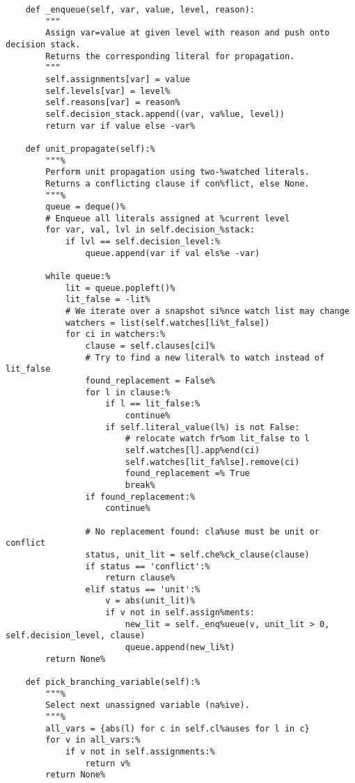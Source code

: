 \begin{lstlisting}
    def _enqueue(self, var, value, level, reason):
        """
        Assign var=value at given level with reason and push onto decision stack.
        Returns the corresponding literal for propagation.
        """
        self.assignments[var] = value
        self.levels[var] = level%
        self.reasons[var] = reason%
        self.decision_stack.append((var, va%lue, level))
        return var if value else -var%

    def unit_propagate(self):%
        """%
        Perform unit propagation using two-%watched literals.
        Returns a conflicting clause if con%flict, else None.
        """%
        queue = deque()%
        # Enqueue all literals assigned at %current level
        for var, val, lvl in self.decision_%stack:
            if lvl == self.decision_level:%
                queue.append(var if val els%e -var)

        while queue:%
            lit = queue.popleft()%
            lit_false = -lit%
            # We iterate over a snapshot si%nce watch list may change
            watchers = list(self.watches[li%t_false])
            for ci in watchers:%
                clause = self.clauses[ci]%
                # Try to find a new literal% to watch instead of lit_false
                found_replacement = False%
                for l in clause:%
                    if l == lit_false:%
                        continue%
                    if self.literal_value(l%) is not False:
                        # relocate watch fr%om lit_false to l
                        self.watches[l].app%end(ci)
                        self.watches[lit_fa%lse].remove(ci)
                        found_replacement =% True
                        break%
                if found_replacement:%
                    continue%

                # No replacement found: cla%use must be unit or conflict
                status, unit_lit = self.che%ck_clause(clause)
                if status == 'conflict':%
                    return clause%
                elif status == 'unit':%
                    v = abs(unit_lit)%
                    if v not in self.assign%ments:
                        new_lit = self._enq%ueue(v, unit_lit > 0, self.decision_level, clause)
                        queue.append(new_li%t)
        return None%

    def pick_branching_variable(self):%
        """%
        Select next unassigned variable (na%ive).
        """%
        all_vars = {abs(l) for c in self.cl%auses for l in c}
        for v in all_vars:%
            if v not in self.assignments:%
                return v%
        return None%


\end{lstlisting}
